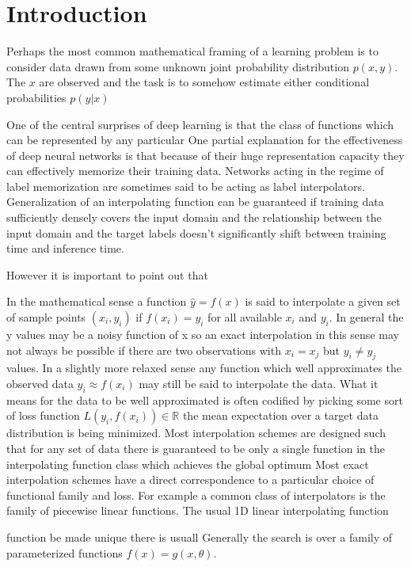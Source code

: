 \documentclass[twoside,11pt]{article}
\begin{document}
\section{Introduction}

Perhaps the most common mathematical framing of a learning problem is to consider data drawn from some unknown joint probability distribution $p(x, y)$. The $x$ are observed and the task is to somehow estimate either conditional probabilities $p(y | x)$

One of the central surprises of deep learning is that the class of functions which can be represented by any particular 
One partial explanation for the effectiveness of deep neural networks is that because of their huge representation capacity they can effectively memorize their training data. 
Networks acting in the regime of label memorization are sometimes said to be acting as label interpolators. 
Generalization of an interpolating function can be guaranteed if training data sufficiently densely covers the input domain and the relationship between the input domain and the target labels doesn't significantly shift between training time and inference time. 

However it is important to point out that 

In the mathematical sense a function $\hat{y} = f(x)$ is said to interpolate a given set of sample points $(x_i, y_i)$ if $f(x_i) = y_i$ for all available $x_i$ and $y_i$. In general the y values may be a noisy function of x so an exact interpolation in this sense may not always be possible if there are two observations with $x_i=x_j$ but $y_i\neq y_j$ values. 
In a slightly more relaxed sense any function which well approximates the observed data $y_i \approx f(x_i)$ may still be said to interpolate the data. What it means for the data to be well approximated is often codified by picking some sort of loss function $L(y_i, f(x_i)) \in \mathbb{R}$ the mean expectation over a target data distribution is being minimized. 
Most interpolation schemes are designed such that for any set of data there is guaranteed to be only a single function in the interpolating function class which achieves the global optimum 
Most exact interpolation schemes have a direct correspondence to a particular choice of functional family and loss. For example a common class of interpolators is the family of piecewise linear functions. The usual 1D linear interpolating function 

function be made unique there is usuall 
Generally the search is over a family of parameterized functions $f(x) = g(x, \theta)$. 
\end{document}
